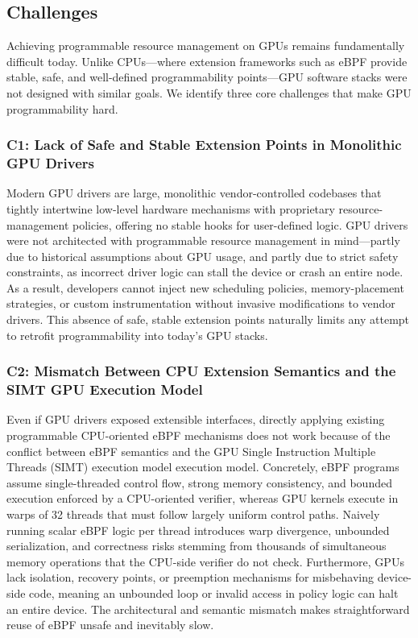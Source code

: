 \subsection{Challenges}
\label{sec:challenges}
Achieving programmable resource management on GPUs remains fundamentally difficult today. 
Unlike CPUs—where extension frameworks such as eBPF provide stable, safe, and well-defined programmability points—GPU software stacks were not designed with similar goals. 
We identify three core challenges that make GPU programmability hard.

\subsubsection{C1: Lack of Safe and Stable Extension Points in Monolithic GPU Drivers}
Modern GPU drivers are large, monolithic vendor-controlled codebases that tightly intertwine low-level hardware mechanisms with proprietary resource-management policies, offering no stable hooks for user-defined logic. 
GPU drivers were not architected with programmable resource management in mind—partly due to historical assumptions about GPU usage, and partly due to strict safety constraints, as incorrect driver logic can stall the device or crash an entire node. 
As a result, developers cannot inject new scheduling policies, memory-placement strategies, or custom instrumentation without invasive modifications to vendor drivers. This absence of safe, stable extension points naturally limits any attempt to retrofit programmability into today's GPU stacks.

\subsubsection{C2: Mismatch Between CPU Extension Semantics and the SIMT GPU Execution Model}


Even if GPU drivers exposed extensible interfaces, directly applying existing programmable CPU-oriented eBPF mechanisms does not work because of the conflict between eBPF semantics and the GPU Single Instruction Multiple Threads (SIMT) execution model execution model. 
Concretely, eBPF programs assume single-threaded control flow, strong memory consistency, and bounded execution enforced by a CPU-oriented verifier, whereas GPU kernels execute in warps of 32 threads that must follow largely uniform control paths. 
Naively running scalar eBPF logic per thread introduces warp divergence, unbounded serialization, and correctness risks stemming from thousands of simultaneous memory operations that the CPU-side verifier do not check. 
Furthermore, GPUs lack isolation, recovery points, or preemption mechanisms for misbehaving device-side code, meaning an unbounded loop or invalid access in policy logic can halt an entire device. 
The architectural and semantic mismatch makes straightforward reuse of eBPF unsafe and inevitably slow.

